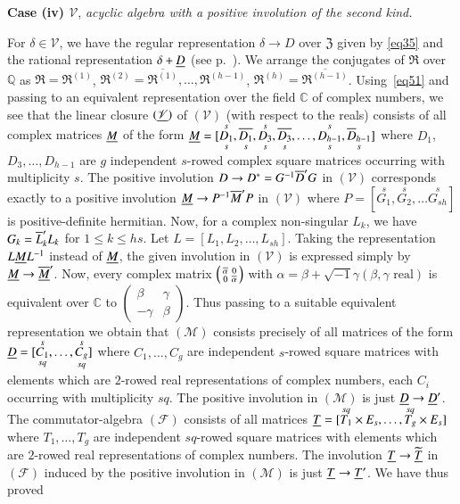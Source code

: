 \medskip
\noindent
{\bf Case (iv) $\mathscr{V}$}, {\em a\pageoriginale cyclic algebra
  with a positive 
  involution of the second kind.}

For $\delta\in\mathscr{V}$, we have the regular representation
$\delta\to D$ over $\mathfrak{Z}$ given by \eqref{eq35} and the rational
representation $\delta+\underline{D}$ (see p.~\pageref{eq49}). We arrange the
conjugates of $\mathfrak{R}$ over $\mathbb{Q}$ as
$\mathfrak{R}=\mathfrak{R}^{(1)}$,
$\mathfrak{R}^{(2)}=\overline{\mathfrak{R}^{(1)}},\ldots,\mathfrak{R}^{(h-1)}$,
$\mathfrak{R}^{(h)}=\overline{\mathfrak{R}^{(h-1)}}$. Using~\eqref{eq51}
and passing to an equivalent representation over the field
$\mathbb{C}$ of complex numbers, we see that the linear closure
$(\underline{\mathscr{V}})$ of $(\mathscr{V})$ (with respect to the reals)
consists of all complex matrices $\underline{M}$ of the form
$\underline{M}=[\underset{s}{\overset{s}{D_{1}}}, \underset{s}{\overline{D_{1}}},
  \underset{s}{\overset{s}{D_{3}}},
  \underset{s}{\overline{D_{3}}},\ldots,\underset{s}{\overset{s}{D_{h-1}}},\underset{s}{\overline{D}_{h-1}}]$
where $D_{1}$, $D_{3},\ldots,D_{h-1}$ are $g$ independent $s$-rowed
complex square matrices occurring with multiplicity $s$. The positive
involution $D\to D^{\ast}=G^{-1}\overline{D}'G$ in $(\mathscr{V})$
corresponds exactly to a positive involution $\underline{M}\to
P^{-1}\overline{M}'P$ in $(\mathscr{V})$ where
$P=[\overset{s}{G_{1}},\overset{s}{G_{2}},\ldots\overset{s}{G_{sh}}]$
is positive-definite hermitian. Now, for a complex non-singular
$L_{k}$, we have $G_{k}=\overline{L}'_{k}L_{k}$ for $1\leq k\leq hs$. Let
$L=[L_{1},L_{2},\ldots,L_{sh}]$. Taking the representation
$L\underline{M}L^{-1}$ instead of $\underline{M}$, the given involution in
$(\mathscr{V})$ is expressed simply by $\underline{M}\to \overline{\underline{M}}'$. Now,
every complex matrix $\left(\begin{smallmatrix} \overline{\alpha} & 0\\ 0
 & \overline{\alpha}\end{smallmatrix}\right)$ with
$\alpha=\beta+\sqrt{-1}\gamma(\beta,\gamma \text{ real})$ is
equivalent over $\mathbb{C}$ to $\left(\begin{smallmatrix} \beta &
  \gamma\\ -\gamma & \beta
\end{smallmatrix}\right)$. Thus passing to a suitable equivalent
representation we obtain that $(\mathscr{M})$ consists precisely of
all matrices of the form
$\underline{D}=[\underset{sq}{\overset{s}{C_{1}}},\ldots,\underset{sq}{\overset{s}{C_{g}}}]$ 
where $C_{1},\ldots,C_{g}$ are independent $s$-rowed square matrices
with elements which are $2$-rowed real representations of complex
numbers, each $C_{i}$ occurring with multiplicity $sq$. The positive
involution in $(\mathscr{M})$ is just $\underline{D}\to \underline{D}'$. The
commutator-algebra $(\mathscr{F})$ consists of all matrices
$\underline{T}=[\overset{sq}{T_{1}}\times
  E_{s},\ldots,\overset{sq}{T_{g}}\times E_{s}]$\pageoriginale where
$T_{1},\ldots,T_{g}$ are independent $sq$-rowed square matrices with
elements which are $2$-rowed real representations of complex
numbers. The involution $\underline{T}\to \widetilde{\underline{T}}$ in
$(\mathscr{F})$ induced by the positive involution in $(\mathscr{M})$
is just $\underline{T}\to \underline{T}'$. We have thus proved

